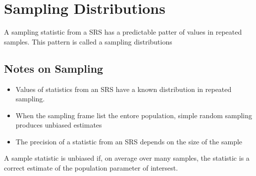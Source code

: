 \section*{Sampling Distributions}

A sampling statistic from a SRS has a predictable patter of values in repeated samples. This pattern is called a sampling distributions






\subsection*{Notes on Sampling}

\begin{itemize}

\item Values of statistics from an SRS have a known distribution in repeated sampling.

\item When the sampling frame list the entore population, simple random sampling produces unbiased estimates

\item The precision of a statistic from an SRS depends on the size of the sample

\end{itemize}

A sample statistic is unbiased if, on average over many samples, the statistic is a correct estimate of the population parameter of intersest.

